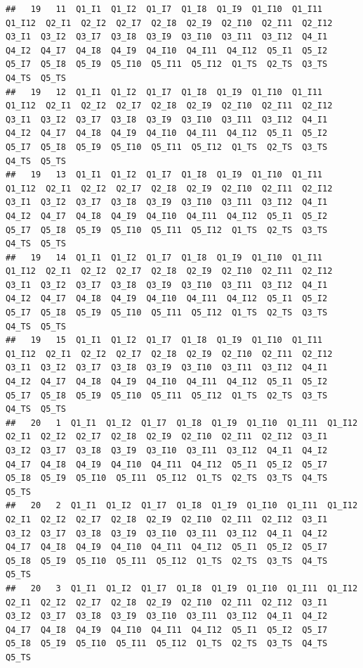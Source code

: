 \documentclass[]{book}
\begin{document}
\begin{verbatim}
##   19   11  Q1_I1  Q1_I2  Q1_I7  Q1_I8  Q1_I9  Q1_I10  Q1_I11  Q1_I12  Q2_I1  Q2_I2  Q2_I7  Q2_I8  Q2_I9  Q2_I10  Q2_I11  Q2_I12  Q3_I1  Q3_I2  Q3_I7  Q3_I8  Q3_I9  Q3_I10  Q3_I11  Q3_I12  Q4_I1  Q4_I2  Q4_I7  Q4_I8  Q4_I9  Q4_I10  Q4_I11  Q4_I12  Q5_I1  Q5_I2  Q5_I7  Q5_I8  Q5_I9  Q5_I10  Q5_I11  Q5_I12  Q1_TS  Q2_TS  Q3_TS  Q4_TS  Q5_TS
##   19   12  Q1_I1  Q1_I2  Q1_I7  Q1_I8  Q1_I9  Q1_I10  Q1_I11  Q1_I12  Q2_I1  Q2_I2  Q2_I7  Q2_I8  Q2_I9  Q2_I10  Q2_I11  Q2_I12  Q3_I1  Q3_I2  Q3_I7  Q3_I8  Q3_I9  Q3_I10  Q3_I11  Q3_I12  Q4_I1  Q4_I2  Q4_I7  Q4_I8  Q4_I9  Q4_I10  Q4_I11  Q4_I12  Q5_I1  Q5_I2  Q5_I7  Q5_I8  Q5_I9  Q5_I10  Q5_I11  Q5_I12  Q1_TS  Q2_TS  Q3_TS  Q4_TS  Q5_TS
##   19   13  Q1_I1  Q1_I2  Q1_I7  Q1_I8  Q1_I9  Q1_I10  Q1_I11  Q1_I12  Q2_I1  Q2_I2  Q2_I7  Q2_I8  Q2_I9  Q2_I10  Q2_I11  Q2_I12  Q3_I1  Q3_I2  Q3_I7  Q3_I8  Q3_I9  Q3_I10  Q3_I11  Q3_I12  Q4_I1  Q4_I2  Q4_I7  Q4_I8  Q4_I9  Q4_I10  Q4_I11  Q4_I12  Q5_I1  Q5_I2  Q5_I7  Q5_I8  Q5_I9  Q5_I10  Q5_I11  Q5_I12  Q1_TS  Q2_TS  Q3_TS  Q4_TS  Q5_TS
##   19   14  Q1_I1  Q1_I2  Q1_I7  Q1_I8  Q1_I9  Q1_I10  Q1_I11  Q1_I12  Q2_I1  Q2_I2  Q2_I7  Q2_I8  Q2_I9  Q2_I10  Q2_I11  Q2_I12  Q3_I1  Q3_I2  Q3_I7  Q3_I8  Q3_I9  Q3_I10  Q3_I11  Q3_I12  Q4_I1  Q4_I2  Q4_I7  Q4_I8  Q4_I9  Q4_I10  Q4_I11  Q4_I12  Q5_I1  Q5_I2  Q5_I7  Q5_I8  Q5_I9  Q5_I10  Q5_I11  Q5_I12  Q1_TS  Q2_TS  Q3_TS  Q4_TS  Q5_TS
##   19   15  Q1_I1  Q1_I2  Q1_I7  Q1_I8  Q1_I9  Q1_I10  Q1_I11  Q1_I12  Q2_I1  Q2_I2  Q2_I7  Q2_I8  Q2_I9  Q2_I10  Q2_I11  Q2_I12  Q3_I1  Q3_I2  Q3_I7  Q3_I8  Q3_I9  Q3_I10  Q3_I11  Q3_I12  Q4_I1  Q4_I2  Q4_I7  Q4_I8  Q4_I9  Q4_I10  Q4_I11  Q4_I12  Q5_I1  Q5_I2  Q5_I7  Q5_I8  Q5_I9  Q5_I10  Q5_I11  Q5_I12  Q1_TS  Q2_TS  Q3_TS  Q4_TS  Q5_TS
##   20   1  Q1_I1  Q1_I2  Q1_I7  Q1_I8  Q1_I9  Q1_I10  Q1_I11  Q1_I12  Q2_I1  Q2_I2  Q2_I7  Q2_I8  Q2_I9  Q2_I10  Q2_I11  Q2_I12  Q3_I1  Q3_I2  Q3_I7  Q3_I8  Q3_I9  Q3_I10  Q3_I11  Q3_I12  Q4_I1  Q4_I2  Q4_I7  Q4_I8  Q4_I9  Q4_I10  Q4_I11  Q4_I12  Q5_I1  Q5_I2  Q5_I7  Q5_I8  Q5_I9  Q5_I10  Q5_I11  Q5_I12  Q1_TS  Q2_TS  Q3_TS  Q4_TS  Q5_TS
##   20   2  Q1_I1  Q1_I2  Q1_I7  Q1_I8  Q1_I9  Q1_I10  Q1_I11  Q1_I12  Q2_I1  Q2_I2  Q2_I7  Q2_I8  Q2_I9  Q2_I10  Q2_I11  Q2_I12  Q3_I1  Q3_I2  Q3_I7  Q3_I8  Q3_I9  Q3_I10  Q3_I11  Q3_I12  Q4_I1  Q4_I2  Q4_I7  Q4_I8  Q4_I9  Q4_I10  Q4_I11  Q4_I12  Q5_I1  Q5_I2  Q5_I7  Q5_I8  Q5_I9  Q5_I10  Q5_I11  Q5_I12  Q1_TS  Q2_TS  Q3_TS  Q4_TS  Q5_TS
##   20   3  Q1_I1  Q1_I2  Q1_I7  Q1_I8  Q1_I9  Q1_I10  Q1_I11  Q1_I12  Q2_I1  Q2_I2  Q2_I7  Q2_I8  Q2_I9  Q2_I10  Q2_I11  Q2_I12  Q3_I1  Q3_I2  Q3_I7  Q3_I8  Q3_I9  Q3_I10  Q3_I11  Q3_I12  Q4_I1  Q4_I2  Q4_I7  Q4_I8  Q4_I9  Q4_I10  Q4_I11  Q4_I12  Q5_I1  Q5_I2  Q5_I7  Q5_I8  Q5_I9  Q5_I10  Q5_I11  Q5_I12  Q1_TS  Q2_TS  Q3_TS  Q4_TS  Q5_TS

\end{verbatim}
\end{document}
